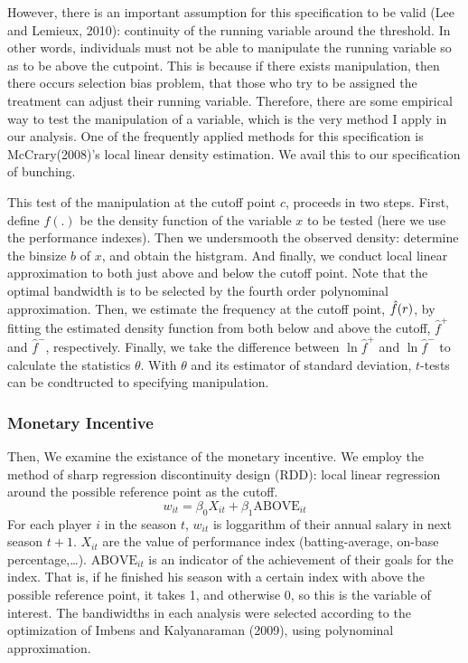 \documentclass[dvipdfmx, 12pt]{article}
\begin{document}
  However, there is an important assumption for this specification to be valid (Lee and Lemieux, 2010): continuity of the running variable around the threshold. In other words, individuals must not be able to manipulate the running variable so as to be above the cutpoint. This is because if there exists manipulation, then there occurs selection bias problem, that those who try to be assigned the treatment can adjust their running variable. Therefore, there are some empirical way to test the manipulation of a variable, which is the very method I apply in our analysis. One of the frequently applied methods for this specification is  McCrary(2008)'s local linear density estimation. We avail this to our specification of bunching.

  This test of the manipulation at the cutoff point $c$, proceeds in two steps. First, define $f(.)$ be the density function of the variable $x$ to be tested (here we use the performance indexes). Then we undersmooth the observed density: determine the binsize $b$ of $x$, and obtain the histgram. And finally, we conduct local linear approximation to both just above and below the cutoff point. Note that the optimal bandwidth is to be selected by the fourth order polynominal approximation. Then, we estimate the frequency at the cutoff point, $\Hat{f}(r)$, by fitting the estimated density function from both below and above the cutoff, $\hat{f}^+$ and $\hat{f}^-$, respectively. Finally, we take the difference between $\ln \hat{f}^+$ and $\ln \hat{f}^-$ to calculate the statistics $\theta$. With $\theta$ and its estimator of standard deviation, $t$-tests can be condtructed to specifying manipulation.

  \subsubsection{Monetary Incentive}

  Then, We examine the existance of the monetary incentive. We employ the method of sharp regression discontinuity design (RDD): local linear regression around the possible reference point as the cutoff.
  \[
  w_{it} = \beta_0 X_{it} + \beta_1 \text{ABOVE}_{it}
  \]
  For each player $i$ in the season $t$, $w_{it}$ is loggarithm of their annual salary in next season $t+1$. $X_{it}$ are the value of performance index (batting-average, on-base percentage,\ldots). $\text{ABOVE}_{it}$ is an indicator of the achievement of their goals for the index. That is, if he finished his season with a certain index with above the possible reference point, it takes 1, and otherwise 0, so this is the variable of interest. The bandiwidths in each analysis were selected according to the optimization of Imbens and Kalyanaraman (2009), using polynominal approximation.
\end{document}
